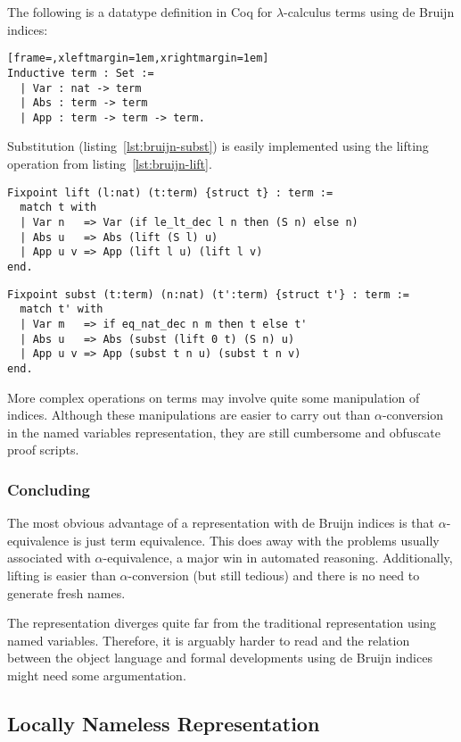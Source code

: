 \documentclass[a4paper,11pt]{article}
\begin{document}
The following is a datatype definition in Coq for $\lambda$-calculus
terms using de Bruijn indices:
\begin{lstlisting}[frame=,xleftmargin=1em,xrightmargin=1em]
Inductive term : Set :=
  | Var : nat -> term
  | Abs : term -> term
  | App : term -> term -> term.
\end{lstlisting}
Substitution (listing~\ref{lst:bruijn-subst}) is easily implemented
using the lifting operation from listing~\ref{lst:bruijn-lift}.
\begin{lstlisting}[float,caption={{\small \em (de Bruijn indices)} Lifting},label=lst:bruijn-lift]
Fixpoint lift (l:nat) (t:term) {struct t} : term :=
  match t with
  | Var n   => Var (if le_lt_dec l n then (S n) else n)
  | Abs u   => Abs (lift (S l) u)
  | App u v => App (lift l u) (lift l v)
end.
\end{lstlisting}
\begin{lstlisting}[float,caption={{\small \em (de Bruijn indices)} Substitution},label=lst:bruijn-subst]
Fixpoint subst (t:term) (n:nat) (t':term) {struct t'} : term :=
  match t' with
  | Var m   => if eq_nat_dec n m then t else t'
  | Abs u   => Abs (subst (lift 0 t) (S n) u)
  | App u v => App (subst t n u) (subst t n v)
end.
\end{lstlisting}
More complex operations on terms may involve quite some
manipulation of indices.
Although these manipulations are easier to carry out than
$\alpha$-conversion in the named variables representation, they
are still cumbersome and obfuscate proof scripts.

\subsubsection*{Concluding} %

The most obvious advantage of a representation with de Bruijn
indices is that $\alpha$-equivalence is just term equivalence.
This does away with the problems usually associated with
$\alpha$-equivalence, a major win in automated reasoning.
Additionally, lifting is easier than $\alpha$-conversion (but
still tedious)  and there is no need to generate fresh names.

The representation diverges quite far from the traditional
representation using named variables.
Therefore, it is arguably harder to read and the relation
between the object language and formal developments using de
Bruijn indices might need some argumentation.


\subsection{Locally Nameless Representation}
\end{document}
